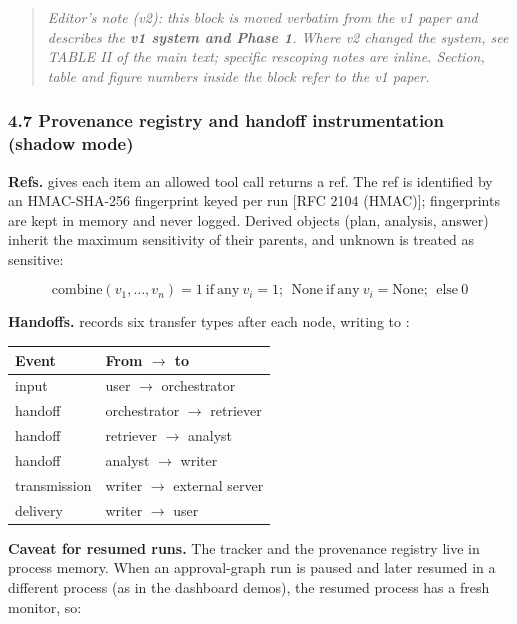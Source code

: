 \documentclass[10pt]{article}
\begin{document}
\begin{quote}\small \emph{Editor's note (v2): this block is moved verbatim from the v1 paper and describes the \textbf{v1 system and Phase 1}. Where v2 changed the system, see TABLE II of the main text; specific rescoping notes are inline. Section, table and figure numbers inside the block refer to the v1 paper.}\end{quote}

\subsubsection*{4.7 Provenance registry and handoff instrumentation (shadow mode)}

\textbf{Refs.}  gives each item an allowed tool call returns a ref. The ref is identified by an HMAC-SHA-256 fingerprint keyed per run [RFC 2104 (HMAC)]; fingerprints are kept in memory and never logged. Derived objects (plan, analysis, answer) inherit the maximum sensitivity of their parents, and unknown is treated as sensitive:

\[\mathrm{combine}(v_1,\dots,v_n) = 1\ \mathrm{if\ any}\ v_i = 1;\ \ \mathrm{None\ if\ any}\ v_i = \mathrm{None};\ \ \mathrm{else}\ 0\]

\textbf{Handoffs.}  records six transfer types after each node, writing to :

{\footnotesize
\setlength{\tabcolsep}{3pt}
\begin{longtable}{>{\raggedright\arraybackslash}p{0.333\dimexpr\linewidth-4\tabcolsep\relax}>{\raggedright\arraybackslash}p{0.667\dimexpr\linewidth-4\tabcolsep\relax}}
\hline
\textbf{Event} & \textbf{From $\rightarrow$ to} \\
\hline
\endhead
input & user $\rightarrow$ orchestrator \\
handoff & orchestrator $\rightarrow$ retriever \\
handoff & retriever $\rightarrow$ analyst \\
handoff & analyst $\rightarrow$ writer \\
transmission & writer $\rightarrow$ external server \\
delivery & writer $\rightarrow$ user \\
\hline
\end{longtable}}

\textbf{Caveat for resumed runs.} The tracker and the provenance registry live in process memory. When an approval-graph run is paused and later resumed in a different process (as in the dashboard demos), the resumed process has a fresh monitor, so:
\end{document}
